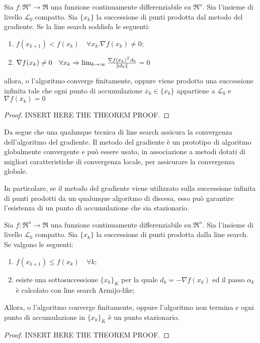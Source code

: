 \begin{theorem}
	\label{thm:methods.gradient.convergence}
	Sia $f:\Re^{n}\rightarrow\Re$ una funzione continuamente differenziabile su	$\Re^{n}$. Sia l'insieme di livello $\mathcal{L}_{0}$ compatto.	Sia $\{x_{k}\}$ la successione di punti prodotta dal metodo del gradiente.
  Se la line search soddisfa le seguenti:

  \begin{enumerate}
    \item $f(x_{k+1})<f(x_{k})\quad\forall x_{k}.\nabla f(x_{k})\neq 0$;
    \item $\nabla f(x_{k})\neq 0\quad\forall x_{k}\Rightarrow\lim_{k\rightarrow\infty}\frac{\nabla f(x_{k})^{T}d_{k}}{\parallel d_{k} \parallel}=0$
  \end{enumerate}

  allora, o l'algoritmo converge finitamente, oppure viene prodotto una successione infinita tale che ogni punto di accumulazione $\overline{x}_{k}\in\{x_{k}\}$ appartiene a $\mathcal{L}_{0}$ e $\nabla f(\overline{x}_{k})=0$

  \begin{proof}
  	INSERT HERE THE THEOREM PROOF.
  \end{proof}
\end{theorem}

Da  segue che una qualunque tecnica di line search assicura la convergenza dell'algoritmo del gradiente.
Il metodo del gradiente è un prototipo di algoritmo globalmente convergente e può essere usato, in associazione a metodi dotati di migliori caratteristiche di convergenza locale, per assicurare la convergenza globale.

In particolare, se il metodo del gradiente viene utilizzato sulla successione infinita di punti prodotti da un qualunque algoritmo di discesa, esso può garantire l'esistenza di un punto di accumulazione che sia stazionario.

\begin{theorem}
  \label{thm:methods.gradient.stationariety}
  	Sia $f:\Re^{n}\rightarrow\Re$ una funzione continuamente differenziabile su	$\Re^{n}$. Sia l'insieme di livello $\mathcal{L}_{0}$ compatto.	Sia $\{x_{k}\}$ la successione di punti prodotta dalla line search.
    Se valgono le seguenti:
    \begin{enumerate}
      \item $f(x_{k+1})\leq f(x_{k})\quad\forall k$;
      \item esiste una sottosuccessione $\{x_{k}\}_{K}$ per la quale $d_{k}=-\nabla f(x_{k})$ ed il passo $\alpha_{k}$ è calcolato con line search Armijo-like;
    \end{enumerate}
    Allora, o l'algoritmo converge finitamente, oppure l'algoritmo non termina e ogni punto di accumulazione in $\{x_{k}\}_{K}$ è un punto stazionario.

    \begin{proof}
      INSERT HERE THE THEOREM PROOF.
    \end{proof}
\end{theorem}


